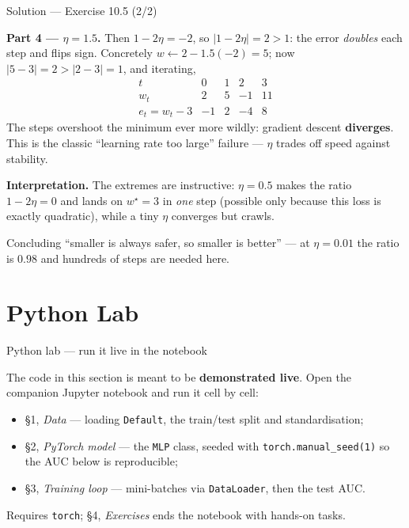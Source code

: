 \documentclass[aspectratio=169,11pt]{beamer}
\begin{document}
\begin{frame}{Solution --- Exercise 10.5 (2/2)}
\begin{solutionbox}
  \textbf{Part 4 --- $\eta = 1.5$.} Then $1 - 2\eta = -2$, so
  $|1 - 2\eta| = 2 > 1$: the error \emph{doubles} each step and flips
  sign. Concretely $w \leftarrow 2 - 1.5(-2) = 5$; now
  $|5 - 3| = 2 > |2 - 3| = 1$, and iterating,
  \[
    \begin{array}{c|cccc}
      t & 0 & 1 & 2 & 3 \\ \hline
      w_t & 2 & 5 & -1 & 11 \\
      e_t = w_t - 3 & -1 & 2 & -4 & 8
    \end{array}
  \]
  The steps overshoot the minimum ever more wildly: gradient
  descent \textbf{diverges}. This is the classic ``learning rate too
  large'' failure --- $\eta$ trades off speed against stability.

  \medskip
  \textbf{Interpretation.} The extremes are instructive: $\eta = 0.5$ makes
  the ratio $1 - 2\eta = 0$ and lands on $w^\star = 3$ in \emph{one} step
  (possible only because this loss is exactly quadratic), while a tiny
  $\eta$ converges but crawls.

\end{solutionbox}
\begin{mistake}
  Concluding ``smaller is always safer, so smaller is better'' --- at
  $\eta = 0.01$ the ratio is $0.98$ and hundreds of steps are needed here.
\end{mistake}
\end{frame}

\section{Python Lab}

\begin{frame}{Python lab --- run it live in the notebook}
  \begin{labnote}
    The code in this section is meant to be \textbf{demonstrated live}. Open the companion Jupyter notebook and run it cell by cell:
    \begin{itemize}
      \item \S1, \emph{Data} --- loading \texttt{Default}, the train/test split and standardisation;
      \item \S2, \emph{PyTorch model} --- the \texttt{MLP} class, seeded with \texttt{torch.manual\_seed(1)} so the AUC below is reproducible;
      \item \S3, \emph{Training loop} --- mini-batches via \texttt{DataLoader}, then the test AUC.
    \end{itemize}
    Requires \texttt{torch}; \S4, \emph{Exercises} ends the notebook with hands-on tasks.
  \end{labnote}
\end{frame}
\end{document}
